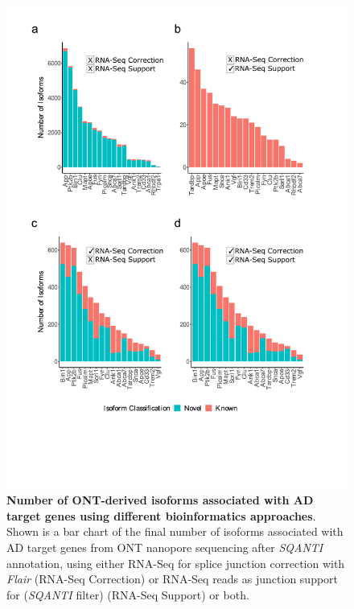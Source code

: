 \begin{figure}[htp]
	\centering
	\includegraphics[page=1,trim={0cm 4cm 0cm 0cm},clip,scale = 0.8]{Figures/ONTTargetedTranscriptome_BioinformaticsPipeline}
	\captionsetup{width=0.95\textwidth,singlelinecheck=off}
	\caption[Number of ONT-derived isoforms associated with AD target genes using different bioinformatics approaches]%
	{\textbf{Number of ONT-derived isoforms associated with AD target genes using different bioinformatics approaches}. Shown is a bar chart of the final number of isoforms associated with AD target genes from ONT nanopore sequencing after \textit{SQANTI} annotation, using either RNA-Seq for splice junction correction with \textit{Flair} (RNA-Seq Correction) or RNA-Seq reads as junction support for (\textit{SQANTI} filter) (RNA-Seq Support) or both.   
	}
	\label{fig:ONT_bioinformatics}
\end{figure}

